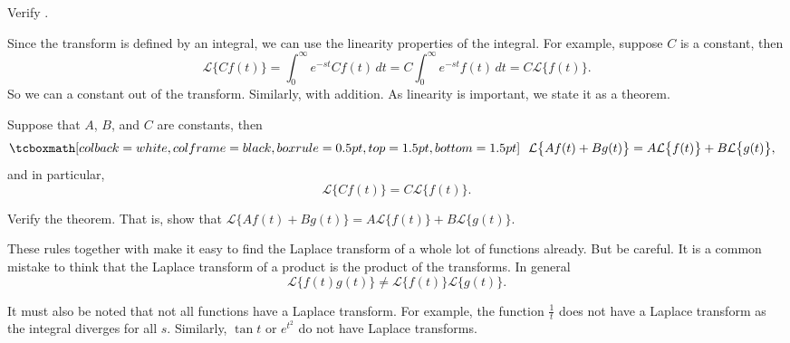 \begin{exercise}
Verify .
\end{exercise}

Since the transform is defined by an integral, we can use the linearity
properties of the integral.  For example, suppose $C$ is a constant, then
\begin{equation*}
\mathcal{L} \bigl\{ C f(t) \bigr\} =
\int_0^\infty e^{-st} C f(t) \,dt =
C \int_0^\infty e^{-st} f(t) \,dt =
C \mathcal{L} \bigl\{ f(t) \bigr\} .
\end{equation*}
So we can  a constant out of the transform.
Similarly, with addition.
As linearity is important, we state it as a theorem.

\begin{theorem}
Suppose that $A$, $B$, and $C$ are constants, then
\begin{equation*}
\mybxbg{~~
\mathcal{L} \bigl\{ A f(t) + B g(t) \bigr\} =
A \mathcal{L} \bigl\{ f(t) \bigr\} +
B \mathcal{L} \bigl\{ g(t) \bigr\} ,
~~}
\end{equation*}
and in particular,
\begin{equation*}
\mathcal{L} \bigl\{ C f(t) \bigr\} =
C \mathcal{L} \bigl\{ f(t) \bigr\} .
\end{equation*}
\end{theorem}

\begin{exercise}
Verify the theorem.  That is, show that
$\mathcal{L} \bigl\{ A f(t) + B g(t) \bigr\} =
A \mathcal{L} \bigl\{ f(t) \bigr\} +
B \mathcal{L} \bigl\{ g(t) \bigr\}$.
\end{exercise}

These rules together with  make it easy to find
the Laplace transform of a whole lot of functions already.
But be careful.
It is a common mistake to think that the Laplace transform of a product
is the product of the transforms.  In general 
\begin{equation*}
\mathcal{L} \bigl\{ f(t) g(t) \bigr\} \not=
\mathcal{L} \bigl\{ f(t) \bigr\}
\mathcal{L} \bigl\{ g(t) \bigr\} .
\end{equation*}

It must also be noted that not all functions have a Laplace transform.  For
example, the function $\frac{1}{t}$ does not have a Laplace transform as the
integral diverges for all $s$.  Similarly,
$\tan t$ or $e^{t^2}$ do not have Laplace transforms.

